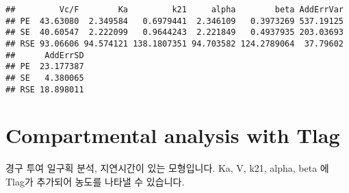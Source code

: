 \documentclass[
  9pt,
]{krantz}
\begin{document}
\begin{verbatim}
##         Vc/F        Ka         k21     alpha        beta AddErrVar
## PE  43.63080  2.349584   0.6979441  2.346109   0.3973269 537.19125
## SE  40.60547  2.222099   0.9644243  2.221849   0.4937935 203.03693
## RSE 93.06606 94.574121 138.1807351 94.703582 124.2789064  37.79602
##      AddErrSD
## PE  23.177387
## SE   4.380065
## RSE 18.898011
\end{verbatim}

\hypertarget{compartmental-analysis-with-tlag-1}{%
\section{Compartmental analysis with Tlag}\label{compartmental-analysis-with-tlag-1}}

경구 투여 일구획 분석, 지연시간이 있는 모형입니다. Ka, V, k21, alpha, beta 에 Tlag가 추가되어 농도를 나타낼 수 있습니다.
\end{document}
